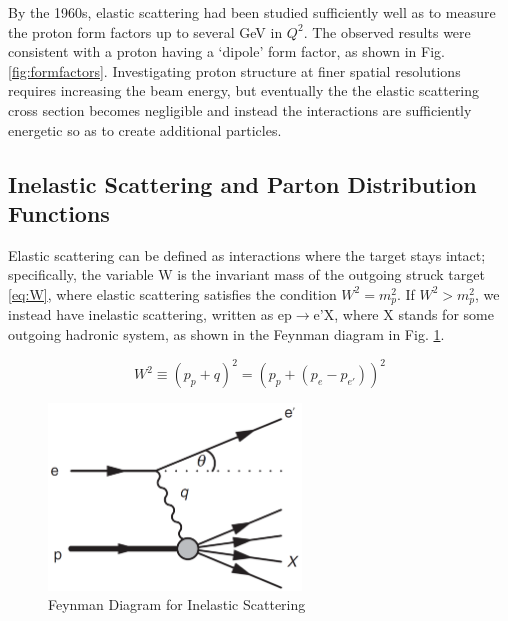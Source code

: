                 By the 1960s, elastic scattering had been studied sufficiently well as to measure the proton form factors up to several GeV in $Q^2$. The observed results were consistent with a proton having a `dipole' form factor, as shown in Fig. \ref{fig:formfactors}. Investigating proton structure at finer spatial resolutions requires increasing the beam energy, but eventually the the elastic scattering cross section becomes negligible and instead the interactions are sufficiently energetic so as to create additional particles.
                






    \subsection{Inelastic Scattering and Parton Distribution Functions}

        Elastic scattering can be defined as interactions where the target stays intact; specifically, the variable W is the invariant mass of the outgoing struck target \eqref{eq:W}, where elastic scattering satisfies the condition $W^2 =m_p^2$. If $W^2 > m_p^2$, we instead have inelastic scattering, written as ep$\rightarrow$e'X, where X stands for some outgoing hadronic system, as shown in the Feynman diagram in Fig. \ref{fig:FeynmanInelastic}.    

        \begin{equation}\label{eq:W}
            W^2 \equiv (p_p + q)^2 = (p_p + (p_e-p_{e'}))^2
        \end{equation}
          

    
        \begin{figure}[ht]
            \centering
            \includegraphics[width=0.6\textwidth]{Chapters/Ch1-Intro/Ch1-Sec1-Background/pics/inelastic-ep/eppx.png}
            \caption{Feynman Diagram for Inelastic Scattering}
            \label{fig:FeynmanInelastic}
        \end{figure}


